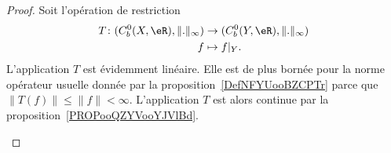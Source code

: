 \begin{proof}
	Soit l'opération de restriction
	\begin{equation}
		\begin{aligned}
			T\colon (C^0_b(X,\eR),\| . \|_{\infty}) & \to (C^0_b(Y,\eR),\| . \|_{\infty}) \\
			f                                       & \mapsto f|_Y.
		\end{aligned}
	\end{equation}
	L'application \( T\) est évidemment linéaire. Elle est de plus bornée pour la norme opérateur usuelle donnée par la proposition~\ref{DefNFYUooBZCPTr} parce que \( \| T(f) \|\leq \| f \|<\infty\). L'application \( T\) est alors continue par la proposition~\ref{PROPooQZYVooYJVlBd}.

	\begin{subproof}


\end{subproof}
\end{proof}
